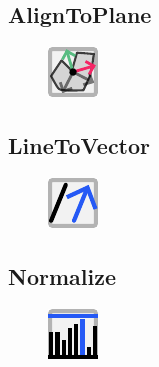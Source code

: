 \documentclass{ol-softwaremanual}
\begin{document}
\subsection{AlignToPlane}
\begin{figure}[h]
    \centering
    \includegraphics[width = .5\textwidth]{figures/Icons/ALIGNTOPLANE.pdf}
\end{figure}

\subsection{LineToVector}
\begin{figure}[h]
    \centering
    \includegraphics[width = .5\textwidth]{figures/Icons/LINETOVECTOR.pdf}
\end{figure}

\subsection{Normalize}
\begin{figure}[h]
    \centering
    \includegraphics[width = .5\textwidth]{figures/Icons/NORMALIZE.pdf}
\end{figure}
\end{document}
